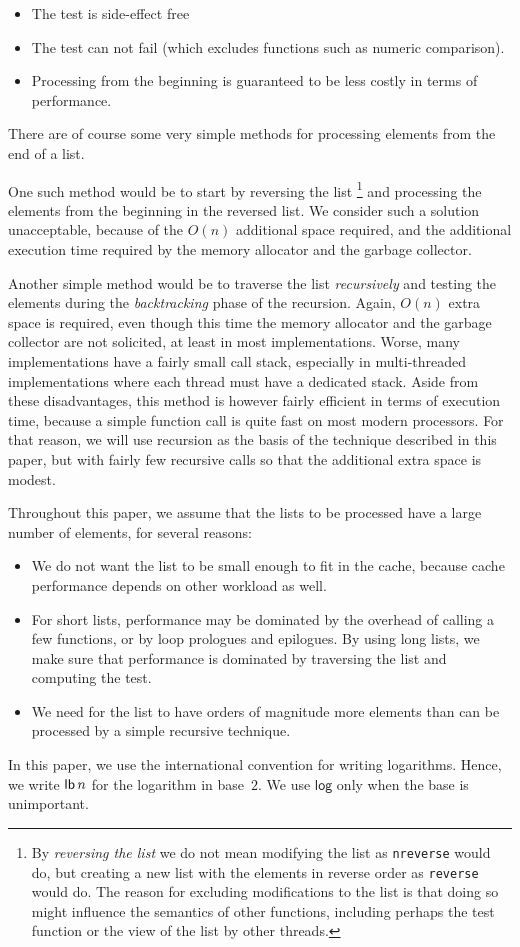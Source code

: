 \begin{itemize}
\item The test is side-effect free
\item The test can not fail (which excludes functions such as numeric
  comparison).
\item Processing from the beginning is guaranteed to be less costly in
  terms of performance.
\end{itemize}

There are of course some very simple methods for processing elements
from the end of a list.

One such method would be to start by reversing the list%
\footnote{By \emph{reversing the list} we do not mean modifying the
  list as \texttt{nreverse} would do, but creating a new list with the
  elements in reverse order as \texttt{reverse} would do.  The reason
  for excluding modifications to the list is that doing so might
  influence the semantics of other functions, including perhaps the
  test function or the view of the list by other threads.}
and processing the elements from the beginning in the reversed list.
We consider such a solution unacceptable, because of the $O(n)$
additional space required, and the additional execution time required
by the memory allocator and the garbage collector.

Another simple method would be to traverse the list \emph{recursively}
and testing the elements during the \emph{backtracking} phase of the
recursion.  Again, $O(n)$ extra space is required, even though this
time the memory allocator and the garbage collector are not solicited,
at least in most implementations.  Worse, many implementations have a
fairly small call stack, especially in multi-threaded implementations
where each thread must have a dedicated stack.  Aside from these
disadvantages, this method is however fairly efficient in terms of
execution time, because a simple function call is quite fast on most
modern processors.  For that reason, we will use recursion as the
basis of the technique described in this paper, but with fairly few
recursive calls so that the additional extra space is modest.

Throughout this paper, we assume that the lists to be processed have a
large number of elements, for several reasons:

\begin{itemize}
\item We do not want the list to be small enough to fit in the cache,
  because cache performance depends on other workload as well.
\item For short lists, performance may be dominated by the overhead of
  calling a few functions, or by loop prologues and epilogues.  By
  using long lists, we make sure that performance is dominated by
  traversing the list and computing the test.
\item We need for the list to have orders of magnitude more elements
  than can be processed by a simple recursive technique.
\end{itemize}

In this paper, we use the international convention for writing
logarithms.  Hence, we write $\mathsf{lb}\thinspace n$ for the
logarithm in base~$2$.  We use $\mathsf{log}$ only when the base is
unimportant.

